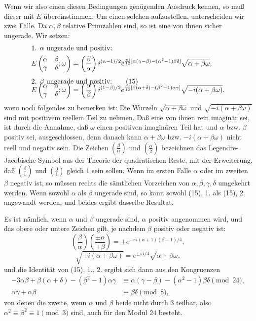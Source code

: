 \documentclass[11pt]{article}
\providecommand{\Jac}[2]{\left(\frac{#1}{#2}\right)}
\begin{document}
Wenn wir also einen diesen Bedingungen genügenden Ausdruck kennen, so muß dieser mit $E$ übereinstimmen. Um einen solchen aufzustellen, unterscheiden wir zwei Fälle. Da $\alpha,\beta$ relative Primzahlen sind, so ist eine von ihnen sicher ungerade. Wir setzen:
\begin{align}
&\text{1. }\alpha\text{ ungerade und positiv:}
\notag\\
&E\left(\begin{matrix}\alpha&\beta\\\gamma&\delta\end{matrix};\omega\right)
=\Jac{\beta}{\alpha} i^{(\alpha-1)/2}
 e^{{\pi i\over12}[\alpha(\gamma-\beta)-(\alpha^2-1)\beta\delta]}
 \sqrt{\alpha+\beta\omega},
\notag\\[0.4em]
&\text{2. }\beta\text{ ungerade und positiv:}
\tag{15}\\[-1.0em]
&E\left(\begin{matrix}\alpha&\beta\\\gamma&\delta\end{matrix};\omega\right)
=\Jac{\alpha}{\beta} i^{(1-\beta)/2}
 e^{{\pi i\over12}[\beta(\alpha+\delta)-(\beta^2-1)\alpha\gamma]}
 \sqrt{-i(\alpha+\beta\omega)}.
\notag
\end{align}
wozu noch folgendes zu bemerken ist: Die Wurzeln $\sqrt{\alpha+\beta\omega}$ und $\sqrt{-i(\alpha+\beta\omega)}$ sind mit positivem reellem Teil zu nehmen. Daß eine von ihnen rein imaginär sei, ist durch die Annahme, daß $\omega$ einen positiven imaginären Teil hat und $\alpha$ bzw. $\beta$ positiv sei, ausgeschlossen, denn danach kann $\alpha+\beta\omega$ bzw. $-i(\alpha+\beta\omega)$ nicht reell und negativ sein. Die Zeichen $\Jac{\beta}{\alpha}$ und $\Jac{\alpha}{\beta}$ bezeichnen das Legendre-Jacobische Symbol aus der Theorie der quadratischen Reste, mit der Erweiterung, daß $\Jac{\beta}{1}$ und $\Jac{0}{1}$ gleich $1$ sein sollen. Wenn im ersten Falle $\alpha$ oder im zweiten $\beta$ negativ ist, so müssen rechts die sämtlichen Vorzeichen von $\alpha,\beta,\gamma,\delta$ umgekehrt werden. Wenn sowohl $\alpha$ als $\beta$ ungerade sind, so kann sowohl (15), 1. als (15), 2. angewandt werden, und beides ergibt dasselbe Resultat.

Es ist nämlich, wenn $\alpha$ und $\beta$ ungerade sind, $\alpha$ positiv angenommen wird, und das obere oder untere Zeichen gilt, je nachdem $\beta$ positiv oder negativ ist:
\[
\Jac{\beta}{\alpha}\Jac{\pm\alpha}{\pm\beta}
=\pm e^{-\pi i(\alpha+1)(\beta-1)/4},
\]
\[
\sqrt{\pm i(\alpha+\beta\omega)}=e^{\pm\pi i/4}\sqrt{\alpha+\beta\omega},
\]
und die Identität von (15), 1., 2. ergibt sich dann aus den Kongruenzen
\begin{align*}
-3\alpha\beta+\beta(\alpha+\delta)-(\beta^2-1)\alpha\gamma
&\equiv \alpha(\gamma-\beta)-(\alpha^2-1)\beta\delta \pmod{24},\\
\alpha\gamma+\alpha\beta&\equiv \beta\delta \pmod8,
\end{align*}
von denen die zweite, wenn $\alpha$ und $\beta$ beide nicht durch $3$ teilbar, also $\alpha^2\equiv\beta^2\equiv1\pmod3$ sind, auch für den Modul $24$ besteht.
\end{document}

